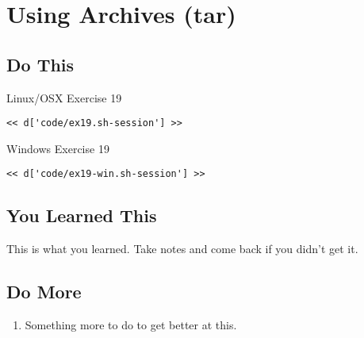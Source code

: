 \chapter{Using Archives (tar)}

\section{Do This}

\begin{code}{Linux/OSX Exercise 19}
\begin{Verbatim}
<< d['code/ex19.sh-session'] >>
\end{Verbatim}
\end{code}

\begin{code}{Windows Exercise 19}
\begin{Verbatim}
<< d['code/ex19-win.sh-session'] >>
\end{Verbatim}
\end{code}

\section{You Learned This}

This is what you learned.  Take notes and come back if you didn't get it.

\section{Do More}

\begin{enumerate}
\item Something more to do to get better at this.
\end{enumerate}

